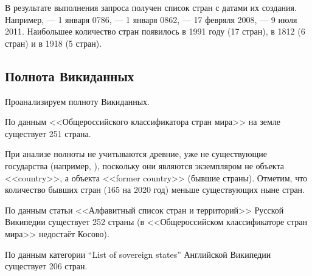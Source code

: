
В результате выполнения запроса получен список стран с датами их создания. Например,  --- 1 января 0786,  --- 1 января 0862,  --- 17 февряля 2008,  --- 9 июля 2011. 
Наибольшее количество стран появилось в 1991 году (17 стран), в 1812 (6 стран) и в 1918 (5 стран).


\subsection{Полнота Викиданных}

Проанализируем полноту Викиданных.

По данным <<Общероссийского классификатора стран мира>>\cite{oksm} на земле существует 251 страна.

При анализе полноты не учитываются древние, уже не существующие государства (например, ), поскольку они являются экземпляром не объекта <<country>>, а объекта <<former country>> (бывшие страны). Отметим, что количество бывших стран (165 на 2020 год) меньше существующих ныне стран.

По данным статьи <<Алфавитный список стран и территорий>>\cite{list_of_sovereign_states} Русской Википедии существует 252 страны (в  <<Общероссийском классификаторе стран мира>> недостаёт Косово).

По данным категории ``List of sovereign states''\cite{list_of_sovereign_states_en} Английской Википедии существует 206 стран.

